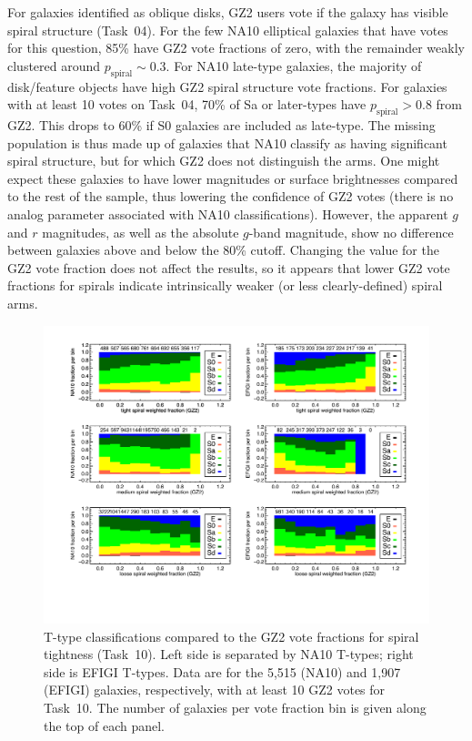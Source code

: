 \documentclass[useAMS,usenatbib]{mn2e}
\begin{document}
For galaxies identified as oblique disks, GZ2 users vote if the galaxy has visible spiral structure (Task~04). For the few NA10 elliptical galaxies that have votes for this question, 85\% have GZ2 vote fractions of zero, with the remainder weakly clustered around $p_\mathrm{spiral}\sim0.3$. For NA10 late-type galaxies, the majority of disk/feature objects have high GZ2 spiral structure vote fractions. For galaxies with at least 10 votes on Task~04, 70\% of Sa or later-types have $p_\mathrm{spiral}>0.8$ from GZ2. This drops to 60\% if S0 galaxies are included as late-type. The missing population is thus made up of galaxies that NA10 classify as having significant spiral structure, but for which GZ2 does not distinguish the arms. One might expect these galaxies to have lower magnitudes or surface brightnesses compared to the rest of the sample, thus lowering the confidence of GZ2 votes (there is no analog parameter associated with NA10 classifications). However, the apparent $g$ and $r$ magnitudes, as well as the absolute $g$-band magnitude, show no difference between galaxies above and below the 80\% cutoff. Changing the value for the GZ2 vote fraction does not affect the results, so it appears that lower GZ2 vote fractions for spirals indicate intrinsically weaker (or less clearly-defined) spiral arms.

\begin{figure}
\includegraphics[angle=0,width=7.0in]{figures/spiraltightness_color.pdf}
\caption{T-type classifications compared to the GZ2 vote fractions for spiral tightness (Task~10). Left side is separated by NA10 T-types; right side is EFIGI T-types. Data are for the 5,515 (NA10) and 1,907 (EFIGI) galaxies, respectively, with at least 10 GZ2 votes for Task~10. The number of galaxies per vote fraction bin is given along the top of each panel. 
\label{fig-spiraltightness}}
\end{figure}
\end{document}
